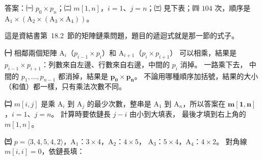\begin{pastsoln}
答案：㈠ $p_0 \times p_n$；㈡ $m[1, n]$，$i = 1$、$j = n$；㈢ 見下表；㈣ $104$ 次，順序是
$\mathrm{A}_1 \times (\mathrm{A}_2 \times (\mathrm{A}_3 \times \mathrm{A}_4))$。

這是資結書第~18.2~節的矩陣鏈乘問題，題目的遞迴式就是那一節的式子。

\textbf{㈠} 相鄰兩個矩陣 $\mathrm{A}_i$（$p_{i-1} \times p_i$）和 $\mathrm{A}_{i+1}$（$p_i \times p_{i+1}$）
可以相乘，結果是 $p_{i-1} \times p_{i+1}$：列數來自左邊、行數來自右邊，中間的 $p_i$ 消掉。 一路乘下去，
中間的 $p_1, \ldots, p_{n-1}$ 都消掉，結果是 $\mathbf{p_0 \times p_n}$。 不論用哪種順序加括號，結果的大小
（和值）都一樣，只有乘法次數不同。

\textbf{㈡} $m[i, j]$ 是乘 $\mathrm{A}_i$ 到 $\mathrm{A}_j$ 的最少次數，整串是 $\mathrm{A}_1$ 到
$\mathrm{A}_n$，所以答案在 $\mathbf{m[1, n]}$，$i = 1$、$j = n$。 計算時要依鏈長 $j - i$ 由小到大填表，
最後才填到右上角的 $m[1, n]$。

\textbf{㈢} $p = \langle 3, 4, 5, 4, 2\rangle$，$\mathrm{A}_1$：$3 \times 4$，$\mathrm{A}_2$：$4 \times 5$，
$\mathrm{A}_3$：$5 \times 4$，$\mathrm{A}_4$：$4 \times 2$。 對角線 $m[i, i] = 0$，依鏈長填：


\end{pastsoln}
